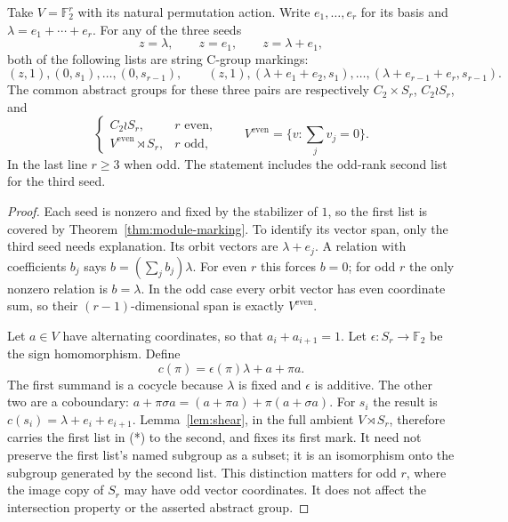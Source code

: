 \begin{proposition}\label{prop:signed}
Take $V=\mathbb F_2^r$ with its natural permutation action. Write
$e_1,\ldots,e_r$ for its basis and $\lambda=e_1+\cdots+e_r$. For any
of the three seeds
\[
 z=\lambda,\qquad z=e_1,\qquad z=\lambda+e_1,
\]
both of the following lists are string C-group markings:
\[
 (z,1),(0,s_1),\ldots,(0,s_{r-1}),
 \qquad
 (z,1),(\lambda+e_1+e_2,s_1),\ldots,
       (\lambda+e_{r-1}+e_r,s_{r-1}).                 \tag{*}
\]
The common abstract groups for these three pairs are respectively
$C_2\times S_r$, $C_2\wr S_r$, and
\[
 \begin{cases}
 C_2\wr S_r,&r\text{ even},\\
 V^{\mathrm{even}}\rtimes S_r,&r\text{ odd},
 \end{cases}
 \qquad V^{\mathrm{even}}=\{v:\sum_j v_j=0\}.
\]
In the last line $r\geq3$ when odd. The statement includes the odd-rank
second list for the third seed.
\end{proposition}
\begin{proof}
Each seed is nonzero and fixed by the stabilizer of $1$, so the first
list is covered by Theorem~\ref{thm:module-marking}. To identify its vector
span, only the third seed needs explanation. Its orbit vectors are
$\lambda+e_j$. A relation with coefficients $b_j$ says
$b=(\sum_j b_j)\lambda$. For even $r$ this forces $b=0$; for odd $r$
the only nonzero relation is $b=\lambda$. In the odd case every orbit
vector has even coordinate sum, so their $(r-1)$-dimensional span is
exactly $V^{\mathrm{even}}$.

Let $a\in V$ have alternating coordinates, so that $a_i+a_{i+1}=1$.
Let $\epsilon:S_r\to\mathbb F_2$ be the sign homomorphism. Define
\[
 c(\pi)=\epsilon(\pi)\lambda+a+\pi a.
\]
The first summand is a cocycle because $\lambda$ is fixed and
$\epsilon$ is additive. The other two are a coboundary:
$a+\pi\sigma a=(a+\pi a)+\pi(a+\sigma a)$.
For $s_i$ the result is $c(s_i)=\lambda+e_i+e_{i+1}$.
Lemma~\ref{lem:shear}, in the full ambient $V\rtimes S_r$, therefore
carries the first list in (*) to the second, and fixes its first mark.
It need not preserve the first list's named subgroup as a subset; it
is an isomorphism onto the subgroup generated by the second list.
This distinction matters for odd $r$, where the image copy of $S_r$
may have odd vector coordinates. It does not affect the intersection
property or the asserted abstract group.
\end{proof}


